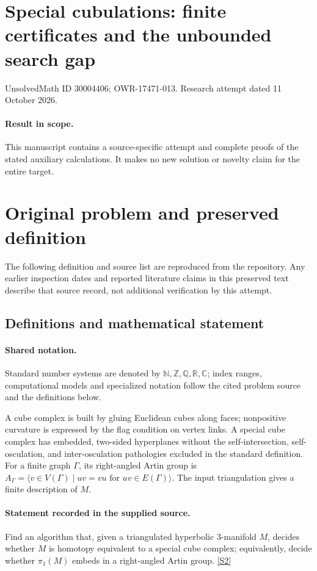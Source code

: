 \documentclass[11pt]{article}
\begin{document}
\section*{Special cubulations: finite certificates and the unbounded search gap}
\noindent UnsolvedMath ID 30004406; OWR-17471-013. Research attempt dated 11 October 2026.
\paragraph{Result in scope.}This manuscript contains a source-specific attempt and complete proofs of the stated auxiliary calculations. It makes no new solution or novelty claim for the entire target.
\section{Original problem and preserved definition}
The following definition and source list are reproduced from the repository. Any earlier inspection dates and reported literature claims in this preserved text describe that source record, not additional verification by this attempt.
\subsection{Definitions and mathematical statement}

\paragraph{Shared notation.}Standard number systems are denoted by $\mathbb N,\mathbb Z,\mathbb Q,\mathbb R,\mathbb C$; index ranges, computational models and specialized notation follow the cited problem source and the definitions below.


A cube complex is built by gluing Euclidean cubes along faces; nonpositive curvature is expressed by the flag condition on vertex links. A special cube complex has embedded, two-sided hyperplanes without the self-intersection, self-osculation, and inter-osculation pathologies excluded in the standard definition. For a finite graph $\Gamma$, its right-angled Artin group is $A_\Gamma=\langle v\in V(\Gamma)\mid uv=vu\text{ for }uv\in E(\Gamma)\rangle$. The input triangulation gives a finite description of $M$.
\paragraph{Statement recorded in the supplied source.}
Find an algorithm that, given a triangulated hyperbolic $3$-manifold $M$, decides whether $M$ is homotopy equivalent to a special cube complex; equivalently, decide whether $\pi_1(M)$ embeds in a right-angled Artin group. \href{https://doi.org/10.4171/owr/2020/8}{[S2]}
\end{document}
